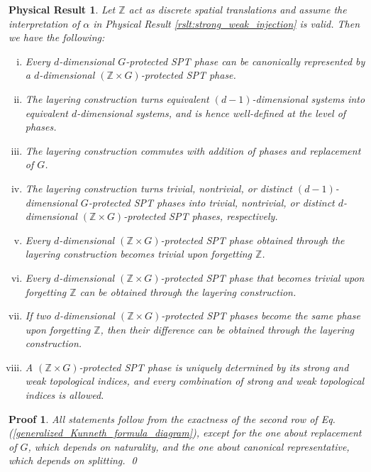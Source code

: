 \documentclass[sort&compress]{elsarticle}
\theoremstyle{theoremstyle}
\theoremstyle{framedtheoremstyle}
\newtheorem{rslt}{Physical Result}
\theoremstyle{definitionstyle}
\theoremstyle{definitionstyle}
\theoremstyle{definitionstyle}
\theoremstyle{definitionstyle}
\theoremstyle{nameddefinitionstyle}
\theoremstyle{framednameddefinitionstyle}
\theoremstyle{proofstyle}
\newtheorem{pf}{Proof}
\theoremstyle{definitionstyle}
\newcommand{\ZZZ}{\mathbb{Z}}
\newcommand{\paren}[1]{\left( #1 \right)}
\begin{document}
\begin{framed}\begin{rslt}\label{rslt:strong_weak_detail}
Let $\ZZZ$ act as discrete spatial translations and assume the interpretation of $\alpha$ in Physical Result \ref{rslt:strong_weak_injection} is valid. Then we have the following:
\begin{enumerate}[(i)]
\item Every $d$-dimensional $G$-protected SPT phase can be canonically represented by a $d$-dimensional $\paren{\ZZZ\times G}$-protected SPT phase.

\item The layering construction turns equivalent $(d-1)$-dimensional systems into equivalent $d$-dimensional systems, and is hence well-defined at the level of phases.

\item The layering construction commutes with addition of phases and replacement of $G$.

\item The layering construction turns trivial, nontrivial, or distinct $(d-1)$-dimensional $G$-protected SPT phases into trivial, nontrivial, or distinct $d$-dimensional $(\ZZZ\times G)$-protected SPT phases, respectively.

\item Every $d$-dimensional $(\ZZZ\times G)$-protected SPT phase obtained through the layering construction becomes trivial upon forgetting $\ZZZ$.

\item Every $d$-dimensional $(\ZZZ\times G)$-protected SPT phase that becomes trivial upon forgetting $\ZZZ$ can be obtained through the layering construction.

\item If two $d$-dimensional $(\ZZZ\times G)$-protected SPT phases become the same phase upon forgetting $\ZZZ$, then their difference can be obtained through the layering construction.

\item A $(\ZZZ\times G)$-protected SPT phase is uniquely determined by its strong and weak topological indices, and every combination of strong and weak topological indices is allowed.
\end{enumerate}
\end{rslt}\end{framed}

\begin{pf}
All statements follow from the exactness of the second row of Eq.\,(\ref{generalized_Kunneth_formula_diagram}), except for the one about replacement of $G$, which depends on naturality, and the one about canonical representative, which depends on splitting.
\qed\end{pf}
\end{document}
